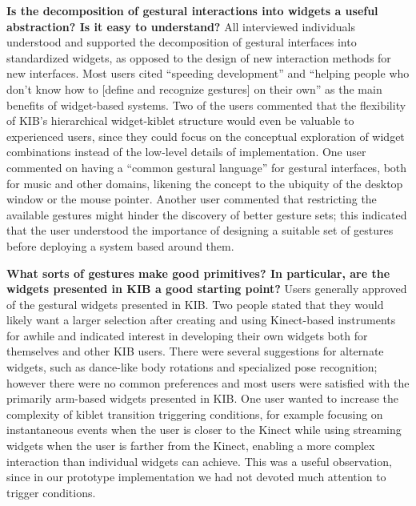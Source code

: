 \documentclass{nime-alternate}
\begin{document}
\textbf{Is the decomposition of gestural interactions into widgets a useful abstraction? Is it easy to understand?}
All interviewed individuals understood and supported the decomposition of gestural interfaces
into standardized widgets, as opposed to the design of new interaction methods for
new interfaces. Most users cited ``speeding development'' and ``helping people who don't know
how to [define and recognize gestures] on their own'' as the main benefits of widget-based systems. 
Two of the users commented that the
flexibility of KIB's hierarchical widget-kiblet structure would even be valuable to experienced users, since
they could focus on the conceptual exploration of widget combinations instead of the low-level details of 
implementation. One user commented on
having a ``common gestural language'' for gestural interfaces, both for music and other domains,
likening the concept to the ubiquity of the desktop window or the mouse pointer. Another
user commented that restricting the available gestures might hinder the discovery of better gesture
sets; this indicated that the user understood the importance of designing a suitable set of
gestures before deploying a system based around them.

\textbf{What sorts of gestures make good primitives? In particular, are the widgets presented in KIB a good starting point?}
Users generally approved of the gestural widgets presented in KIB. Two people stated that they would likely want a larger
selection after creating and using Kinect-based instruments for awhile and indicated interest in developing
their own widgets both for themselves and other KIB users. There were several 
suggestions for alternate widgets, such as dance-like body rotations and specialized pose recognition; however there
were no common preferences and most users were satisfied with the primarily arm-based widgets presented
in KIB. One user wanted to increase the complexity of kiblet transition triggering conditions,
for example focusing on instantaneous events when the user is closer to the Kinect while using streaming
widgets when the user is farther from the Kinect, enabling a more complex interaction than individual widgets can achieve. This was a useful observation, since in our prototype implementation
we had not devoted much attention to trigger conditions.
\end{document}
